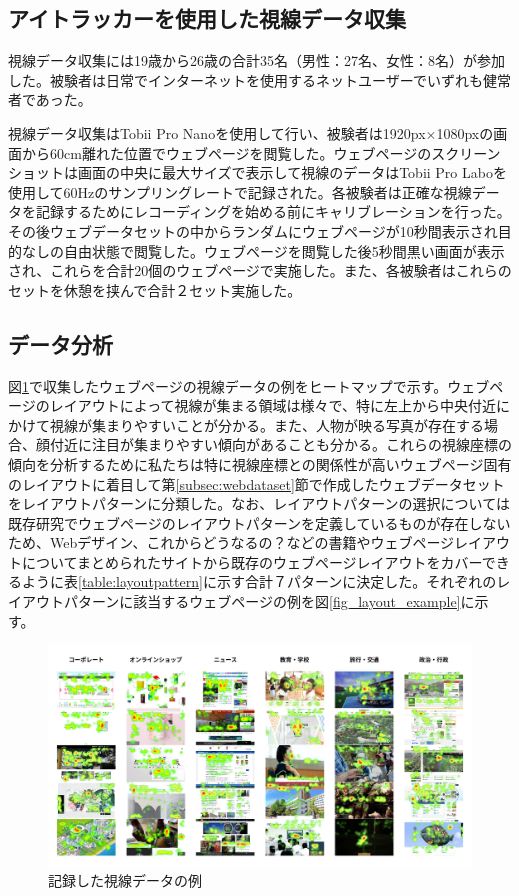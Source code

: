 \subsection{アイトラッカーを使用した視線データ収集}
\par 視線データ収集には19歳から26歳の合計35名（男性：27名、女性：8名）が参加した。被験者は日常でインターネットを使用するネットユーザーでいずれも健常者であった。

\par 視線データ収集はTobii Pro Nano\cite{tobiipronano}を使用して行い、被験者は1920px×1080pxの画面から60cm離れた位置でウェブページを閲覧した。ウェブページのスクリーンショットは画面の中央に最大サイズで表示して視線のデータはTobii Pro Labo\cite{tobiiprolabo}を使用して60Hzのサンプリングレートで記録された。各被験者は正確な視線データを記録するためにレコーディングを始める前にキャリブレーションを行った。その後ウェブデータセットの中からランダムにウェブページが10秒間表示され目的なしの自由状態で閲覧した。ウェブページを閲覧した後5秒間黒い画面が表示され、これらを合計20個のウェブページで実施した。また、各被験者はこれらのセットを休憩を挟んで合計２セット実施した。


\subsection{データ分析}
\par 図\ref{fig_dataset-saliency}で収集したウェブページの視線データの例をヒートマップで示す。ウェブページのレイアウトによって視線が集まる領域は様々で、特に左上から中央付近にかけて視線が集まりやすいことが分かる。また、人物が映る写真が存在する場合、顔付近に注目が集まりやすい傾向があることも分かる。これらの視線座標の傾向を分析するために私たちは特に視線座標との関係性が高いウェブページ固有のレイアウトに着目して第\ref{subsec:webdataset}節で作成したウェブデータセットをレイアウトパターンに分類した。なお、レイアウトパターンの選択については既存研究でウェブページのレイアウトパターンを定義しているものが存在しないため、Webデザイン、これからどうなるの？\cite{bookwebdesign}などの書籍やウェブページレイアウトについてまとめられたサイトから既存のウェブページレイアウトをカバーできるように表\ref{table:layoutpattern}に示す合計７パターンに決定した。それぞれのレイアウトパターンに該当するウェブページの例を図\ref{fig_layout_example}に示す。

\begin{figure}[H]
  \centering
  \includegraphics[width=12.5cm]{figures/05_dataset_saliency.jpg}
  \caption{記録した視線データの例}
  \label{fig_dataset-saliency}
\end{figure}

